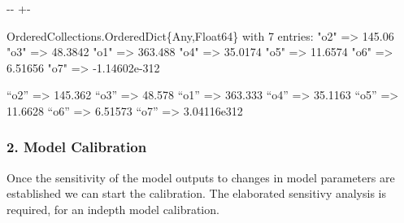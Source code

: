 \documentclass[a4paper,10pt,english]{sphinxmanual}
\newlength\nbsphinxcodecellspacing
\begin{document}
{

\kern-\sphinxverbatimsmallskipamount\kern-\baselineskip
\kern+\FrameHeightAdjust\kern-\fboxrule
\vspace{\nbsphinxcodecellspacing}

\begin{sphinxVerbatim}[commandchars=\\\{\}]
\llap{\color{nbsphinxout}[32]:\,\hspace{\fboxrule}\hspace{\fboxsep}}OrderedCollections.OrderedDict\{Any,Float64\} with 7 entries:
  "o2" => 145.06
  "o3" => 48.3842
  "o1" => 363.488
  "o4" => 35.0174
  "o5" => 11.6574
  "o6" => 6.51656
  "o7" => -1.14602e-312
\end{sphinxVerbatim}
}

\sphinxAtStartPar
“o2” =\textgreater{} 145.362 “o3” =\textgreater{} 48.578 “o1” =\textgreater{} 363.333 “o4” =\textgreater{} 35.1163 “o5” =\textgreater{} 11.6628 “o6” =\textgreater{} 6.51573 “o7” =\textgreater{} 3.04116e\sphinxhyphen{}312


\subsubsection{2. Model Calibration}
\label{\detokenize{jupyter_notebook/parameter-calibration:2.-Model-Calibration}}
\sphinxAtStartPar
Once the sensitivity of the model outputs to changes in model parameters are established we can start the calibration. The elaborated sensitivy analysis is required, for an in\sphinxhyphen{}depth model calibration.

{
\begin{sphinxVerbatim}[commandchars=\\\{\}]
\llap{\color{nbsphinxin}[34]:\,\hspace{\fboxrule}\hspace{\fboxsep}}   
\end{sphinxVerbatim}
}
\end{document}
